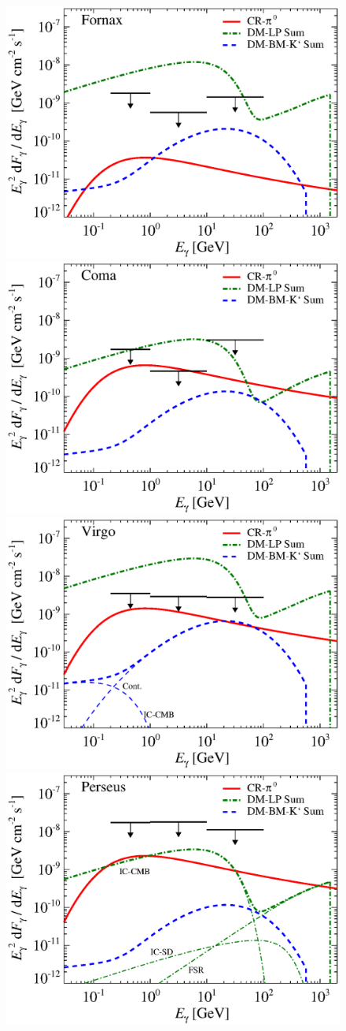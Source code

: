 \documentclass[10pt,aps,pra,reprint,amsmath,amsfonts,amssymb,showpacs,nofootinbib,floatfix]{revtex4-1}
\begin{document}
\begin{figure}
\begin{minipage}{2.0\columnwidth}
 \includegraphics[width=0.49\columnwidth]{figures/flux.cluster.Fornax.v12.0.1deg.1.6T.SubMass.SF300.IR2.noMW.woGal.eps}
\includegraphics[width=0.49\columnwidth]{figures/flux.cluster.Coma.v12.0.1deg.1.6T.SubMass.SF300.IR2.noMW.woGal.eps}
\includegraphics[width=0.49\columnwidth]{figures/flux.cluster.Virgo.v12.0.1deg.1.6T.SubMass.SF300.IR2.noMW.woGal.eps}
\includegraphics[width=0.49\columnwidth]{figures/flux.cluster.Perseus.v12.0.1deg.1.6T.SubMass.SF300.IR2.noMW.woGal.eps}

\end{minipage}
\end{figure}
\end{document}
